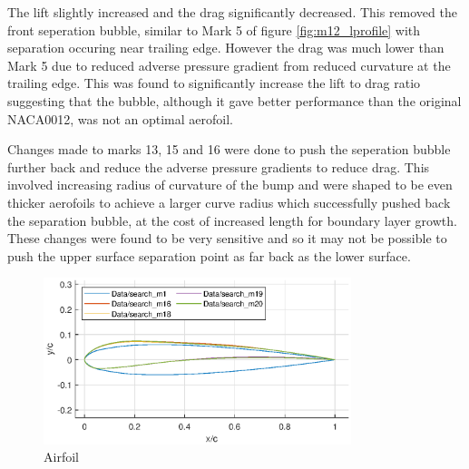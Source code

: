 \documentclass{article}
\begin{document}
The lift slightly increased and the drag significantly decreased.
This removed the front seperation bubble, similar to Mark 5 of figure \ref{fig:m12_lprofile} with separation occuring near trailing edge.
However the drag was much lower than Mark 5 due to reduced adverse pressure gradient from reduced curvature at the trailing edge.
This was found to significantly increase the lift to drag ratio suggesting that the bubble, although it gave better performance than the original NACA0012, was not an optimal aerofoil.

Changes made to marks 13, 15 and 16 were done to push the seperation bubble further back and reduce the adverse pressure gradients to reduce drag.
This involved increasing radius of curvature of the bump and 
were shaped to be even thicker aerofoils to achieve a larger curve radius which successfully pushed back the separation bubble, at the cost of increased length for boundary layer growth.
These changes were found to be very sensitive and so it may not be possible to push the upper surface separation point as far back as the lower surface.

\begin{figure}[H]
    \centering
    \includegraphics[width=0.8\textwidth]{figures/loRe_geometry_20.eps}
    \caption{Airfoil}
    \label{fig:m20_geometry}
\end{figure}
\end{document}
